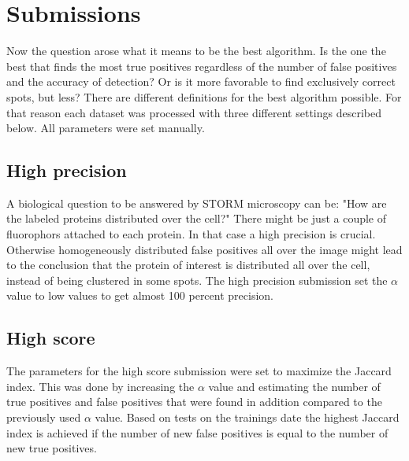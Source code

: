 \section{Submissions}
Now the question arose what it means to be the best algorithm. Is the one the best that finds the most true positives regardless of the number of false positives and the accuracy of detection? Or is it more favorable to find exclusively correct spots, but less? There are different definitions for the best algorithm possible.\newline
For that reason each dataset was processed with three different settings described below. All parameters were set manually.
\subsection{High precision}
A biological question to be answered by STORM microscopy can be: "How are the labeled proteins distributed over the cell?" There might be just a couple of fluorophors attached to each protein. In that case a high precision is crucial. Otherwise homogeneously distributed false positives all over the image might lead to the conclusion that the protein of interest is distributed all over the cell, instead of being clustered in some spots.\newline
The high precision submission set the $\alpha$ value to low values to get almost 100 percent precision.
\subsection{High score}
The parameters for the high score submission were set to maximize the Jaccard index. This was done by increasing the $\alpha$ value and estimating the number of true positives and false positives that were found in addition compared to the previously used $\alpha$ value. Based on tests on the trainings date the highest Jaccard index is achieved if the number of new false positives is equal to the number of new true positives. 
